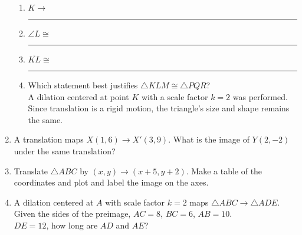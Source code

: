 \documentclass[12pt, twoside]{article}
\begin{document}
\begin{enumerate}
\begin{multicols}{2}
      \begin{enumerate}
        \item $K \rightarrow$ \rule{2cm}{0.15mm}
        \item $\angle L \cong$ \rule{2cm}{0.15mm}
        \item $\overline {KL} \cong$ \rule{2cm}{0.15mm}
        \item Which statement best justifies $\triangle KLM \cong \triangle PQR$? \\[0.5cm]
        A dilation centered at point $K$ with a scale factor $k=2$ was performed.\\[0.5cm]
        Since translation is a rigid motion, the triangle's size and shape remains the same.
      \end{enumerate}
    \end{multicols}

\newpage
\item A translation maps $X(1,6) \rightarrow X'(3,9)$. What is the image of $Y(2,-2)$ under the same translation?

\newpage
\item Translate $\triangle ABC$ by $(x,y) \rightarrow (x+5, y+2)$. Make a table of the coordinates and plot and label the image on the axes.
  \begin{flushright}
  \end{flushright}

\newpage
\item A dilation centered at $A$ with scale factor $k=2$ maps $\triangle ABC \rightarrow \triangle ADE$. Given the sides of the preimage, $AC = 8$, $BC = 6$, $AB = 10$. \\[0.5cm]
$DE = 12$, how long are $AD$ and $AE$?
    \begin{flushright}
    \end{flushright}


\end{enumerate}
\end{document}
